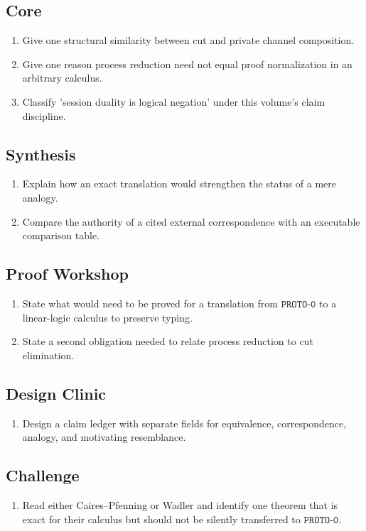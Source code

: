 \subsection*{Core}
\begin{enumerate}[label=\textbf{13.\arabic*},start=4]
\item Give one structural similarity between cut and private channel composition.
\item Give one reason process reduction need not equal proof normalization in an arbitrary calculus.
\item Classify 'session duality is logical negation' under this volume's claim discipline.
\end{enumerate}
\subsection*{Synthesis}
\begin{enumerate}[label=\textbf{13.\arabic*},start=7]
\item Explain how an exact translation would strengthen the status of a mere analogy.
\item Compare the authority of a cited external correspondence with an executable comparison table.
\end{enumerate}
\subsection*{Proof Workshop}
\begin{enumerate}[label=\textbf{13.\arabic*},start=9]
\item State what would need to be proved for a translation from $\texttt{PROTO-0}$ to a linear-logic calculus to preserve typing.
\item State a second obligation needed to relate process reduction to cut elimination.
\end{enumerate}
\subsection*{Design Clinic}
\begin{enumerate}[label=\textbf{13.\arabic*},start=11]
\item Design a claim ledger with separate fields for equivalence, correspondence, analogy, and motivating resemblance.
\end{enumerate}
\subsection*{Challenge}
\begin{enumerate}[label=\textbf{13.\arabic*},start=12]
\item Read either Caires--Pfenning or Wadler and identify one theorem that is exact for their calculus but should not be silently transferred to $\texttt{PROTO-0}$.
\end{enumerate}
